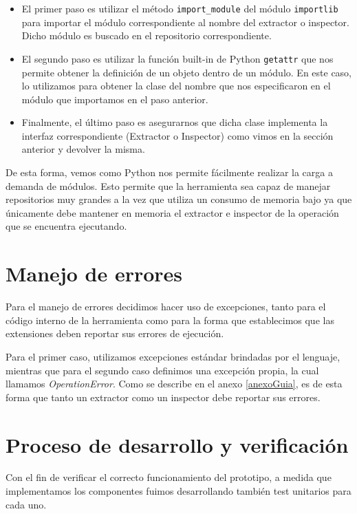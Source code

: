 \begin{itemize}
\item \begin{sloppypar} El primer paso es utilizar el método \texttt{import\_module} del módulo \texttt{importlib} \cite{python-importlib} para importar el módulo correspondiente al nombre del extractor o inspector. Dicho módulo es buscado en el repositorio correspondiente. \end{sloppypar}
\item El segundo paso es utilizar la función built-in de Python \texttt{getattr} que nos permite obtener la definición de un objeto dentro de un módulo. En este caso, lo utilizamos para obtener la clase del nombre que nos especificaron en el módulo que importamos en el paso anterior.
\item Finalmente, el último paso es asegurarnos que dicha clase implementa la interfaz correspondiente (Extractor o Inspector) como vimos en la sección anterior y devolver la misma.
\end{itemize}

De esta forma, vemos como Python nos permite fácilmente realizar la carga a demanda de módulos. Esto permite que la herramienta sea capaz de manejar repositorios muy grandes a la vez que utiliza un consumo de memoria bajo ya que únicamente debe mantener en memoria el extractor e inspector de la operación que se encuentra ejecutando.

\section{Manejo de errores}
Para el manejo de errores decidimos hacer uso de excepciones, tanto para el código interno de la herramienta como para la forma que establecimos que las extensiones deben reportar sus errores de ejecución.

Para el primer caso, utilizamos excepciones estándar brindadas por el lenguaje, mientras que para el segundo caso definimos una excepción propia, la cual llamamos \emph{OperationError}. Como se describe en el anexo \ref{anexoGuia}, es de esta forma que tanto un extractor como un inspector debe reportar sus errores.

\section{Proceso de desarrollo y verificación}
Con el fin de verificar el correcto funcionamiento del prototipo, a medida que implementamos los componentes fuimos desarrollando también test unitarios para cada uno.

